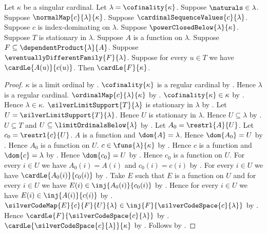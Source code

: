 \begin{theorem}\label{silver_first_almost_disjoint_bound}
    Let $\kappa$ be a singular cardinal.
    Let $\lambda=\cofinality{\kappa}$.
    Suppose $\naturals\in\lambda$.
    Suppose $\normalMap{c}{\lambda}{\kappa}$.
    Suppose $\cardinalSequenceValues{c}{\lambda}$.
    Suppose $c$ is index-dominating on $\lambda$.
    Suppose $\powerClosedBelow{\lambda}{\kappa}$.
    Suppose $T$ is stationary in $\lambda$.
    Suppose $A$ is a function on $\lambda$.
    Suppose $F\subseteq\dependentProduct{\lambda}{A}$.
    Suppose $\eventuallyDifferentFamily{F}{\lambda}$.
    Suppose for every $u\in T$ we have $\cardLe{A(u)}{c(u)}$.
    Then $\cardLe{F}{\kappa}$.
\end{theorem}
\begin{proof}
    $\kappa$ is a limit ordinal
        by .
    $\cofinality{\kappa}$ is a regular cardinal
        by .
    Hence $\lambda$ is a regular cardinal.
    $\ordinalMap{c}{\lambda}{\kappa}$ by .
    $\cofinality{\kappa}\in\kappa$
        by .
    Hence $\lambda\in\kappa$.
    $\silverLimitSupport{T}{\lambda}$ is stationary in $\lambda$
        by .
    Let $U=\silverLimitSupport{T}{\lambda}$.
    Hence $U$ is stationary in $\lambda$.
    Hence $U\subseteq\lambda$ by .
    $U\subseteq T$ and $U\subseteq\limitOrdinalsBelow{\lambda}$
        by .
    Let $A_0=\restrl{A}{U}$.
    Let $c_0=\restrl{c}{U}$.
    $A$ is a function and $\dom{A}=\lambda$.
    Hence $\dom{A_0}=U$
        by .
    Hence $A_0$ is a function on $U$.
    $c\in\funs{\lambda}{\kappa}$
        by .
    Hence $c$ is a function and $\dom{c}=\lambda$
        by .
    Hence $\dom{c_0}=U$
        by .
    Hence $c_0$ is a function on $U$.
    For every $i\in U$ we have $A_0(i)=A(i)$ and $c_0(i)=c(i)$
        by .
    For every $i\in U$ we have $\cardLe{A_0(i)}{c_0(i)}$
        by .
    Take $E$ such that $E$ is a function on $U$ and
        for every $i\in U$ we have
            $E(i)\in\inj{A_0(i)}{c_0(i)}$
        by .
    Hence for every $i\in U$ we have
        $E(i)\in\inj{A(i)}{c(i)}$ by \auto.
    $\silverCodeMap{E}{c}{F}{U}{\lambda}
        \in\inj{F}{\silverCodeSpace{c}{\lambda}}$
        by .
    Hence $\cardLe{F}{\silverCodeSpace{c}{\lambda}}$
        by .
    $\cardLe{\silverCodeSpace{c}{\lambda}}{\kappa}$
        by .
    Follows by .
\end{proof}

